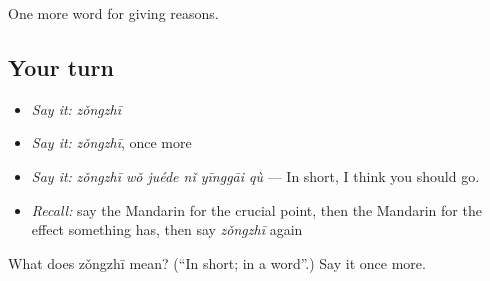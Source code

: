 \begin{grammarlens}[title={What you've built}]
One more word for giving reasons.
\end{grammarlens}

\subsection*{Your turn}
\begin{itemize}
\raggedright
  \item \emph{Say it:} \emph{zǒngzhī}
  \item \emph{Say it:} \emph{zǒngzhī}, once more
  \item \emph{Say it:} \emph{zǒngzhī wǒ juéde nǐ yīnggāi qù} — In short, I think you should go.
  \item \emph{Recall:} say the Mandarin for the crucial point, then the Mandarin for the effect something has, then say \emph{zǒngzhī} again
\end{itemize}

\begin{tcolorbox}[breakable,colback=teal!4,colframe=teal!35!black,title={Before you move on}]
What does zǒngzhī mean? (\textquotedblleft{}In short; in a word\textquotedblright{}.) Say it once more.
\end{tcolorbox}
